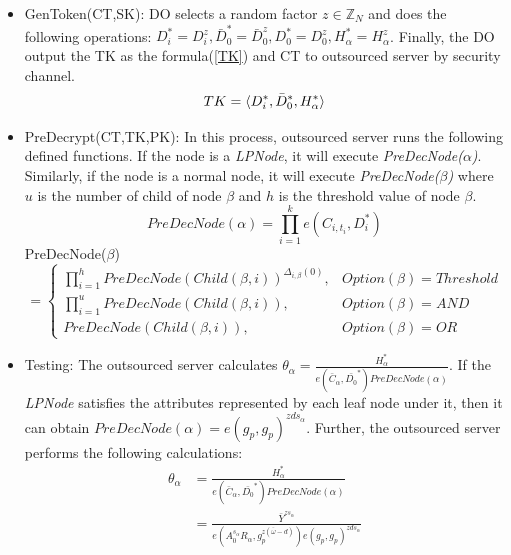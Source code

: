 \documentclass[smallextended]{svjour3}       %
\begin{document}
\begin{itemize}
	\item GenToken(CT,SK): DO selects a random factor $z \in \mathbb{Z}_N$ and does the following operations: $D_i^*=D_i^z,\bar{D}_0^*=\bar{D}_0^z,D_0^*=D_0^z,H_\alpha^*=H_\alpha^z$. 
	Finally, the DO output the TK as the formula(\ref{TK}) and CT to outsourced server by security channel.
	\begin{equation}\label{TK}\\
		TK=\langle D_i^*,\bar{D}_0^*,H^*_\alpha  \rangle
	\end{equation}
	\item PreDecrypt(CT,TK,PK): 
	In this process, outsourced server runs the following defined functions. 
	If the node is a \textit{LPNode}, it will execute \textit{PreDecNode($\alpha$)}. 
	Similarly, if the node is a normal node, it will execute \textit{PreDecNode($\beta$)} where $u$ is the number of child of node $\beta$ and $h$ is the threshold value of node $\beta$.
	\begin{equation}\label{PreDecNodeA}
		PreDecNode(\alpha)=\prod_{i=1}^{k}e(C_{i,t_i},D_i^*)
	\end{equation}
	PreDecNode($\beta$)
	\begin{equation}\label{PreDecNodeB}
		=
		\begin{cases}
		\prod_{i=1}^{h}PreDecNode(Child(\beta,i))^{\Delta_{i,\beta}(0)}, &Option(\beta)=Threshold\\
		\prod_{i=1}^{u}PreDecNode(Child(\beta,i)), &Option(\beta)=AND\\
		PreDecNode(Child(\beta,i)), &Option(\beta)=OR
		\end{cases}
	\end{equation}
	\item Testing: The outsourced server calculates $\theta_\alpha=\frac{H_\alpha^*}{e(\bar{C}_\alpha,\bar{D_0}^*)PreDecNode(\alpha)}$. 
	If the \textit{LPNode} satisfies the attributes represented by each leaf node under it, then it can obtain $PreDecNode(\alpha)=e(g_p,g_p)^{zds_\alpha}$. Further, the outsourced server performs the following calculations:
	\begin{equation}
		\begin{split}
			\theta_\alpha &=\frac{H_\alpha^*}{e(\bar{C}_\alpha,\bar{D_0}^*)PreDecNode(\alpha)}\\
						  &=\frac{\bar{Y}^{zs_\alpha}}{e(A_0^{s_\alpha}R_\alpha,g_p^{z(\bar{\omega}-d)})e(g_p,g_p)^{zds_\alpha}}\\

\end{split}
\end{equation}
\end{itemize}
\end{document}
